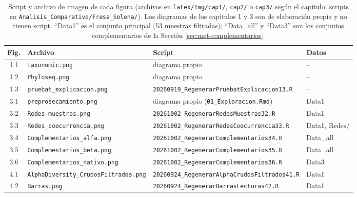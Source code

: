 \begin{table}[H]
\centering
\caption{Script y archivo de imagen de cada figura (archivos en \texttt{latex/Img/cap1/}, \texttt{cap2/} o \texttt{cap3/} según el capítulo; scripts en \texttt{Analisis\_Comparativo/Fresa\_Solena/}). Los diagramas de los capítulos 1 y 3 son de
elaboración propia y no tienen script. ``Data1'' es el conjunto principal (53 muestras filtradas);
``Data\_all'' y ``Data3'' son los conjuntos complementarios de la Sección \ref{sec:met-complementarios}.}
\label{tab:proc-figuras}
\scriptsize
\setlength{\tabcolsep}{3pt}
\begin{tabular}{cp{4.3cm}p{4.9cm}p{1.5cm}}
\hline
Fig. & Archivo & Script & Datos \\
\hline
1.1 & \texttt{taxonomic.png} & diagrama propio & -- \\
1.2 & \texttt{Phyloseq.png} & diagrama propio & -- \\
1.3 & \texttt{pruebat\_explicacion.png} & \texttt{20260919\_Regenerar}\newline\texttt{PruebatExplicacion13.R} & -- \\
3.1 & \texttt{preprosecamiento.png} & diagrama propio (\texttt{01\_Exploracion.Rmd}) & Data1 \\
3.2 & \texttt{Redes\_muestras.png} & \texttt{20261002\_Regenerar}\newline\texttt{RedesMuestras32.R} & Data1 \\
3.3 & \texttt{Redes\_coocurrencia.png} & \texttt{20261002\_Regenerar}\newline\texttt{RedesCoocurrencia33.R} & Data1, Redes/ \\
3.4 & \texttt{Complementarios\_alfa.png} & \texttt{20261002\_Regenerar}\newline\texttt{Complementarios34.R} & Data\_all \\
3.5 & \texttt{Complementarios\_beta.png} & \texttt{20261002\_Regenerar}\newline\texttt{Complementarios35.R} & Data\_all \\
3.6 & \texttt{Complementarios\_nativo.png} & \texttt{20261002\_Regenerar}\newline\texttt{Complementarios36.R} & Data3 \\
4.1 & \texttt{AlphaDiversity\_}\newline\texttt{CrudosFiltrados.png} & \texttt{20260924\_Regenerar}\newline\texttt{AlphaCrudosFiltrados41.R} & Data1 \\
4.2 & \texttt{Barras.png} & \texttt{20260924\_Regenerar}\newline\texttt{BarrasLecturas42.R} & Data1 \\

\end{tabular}
\end{table}
